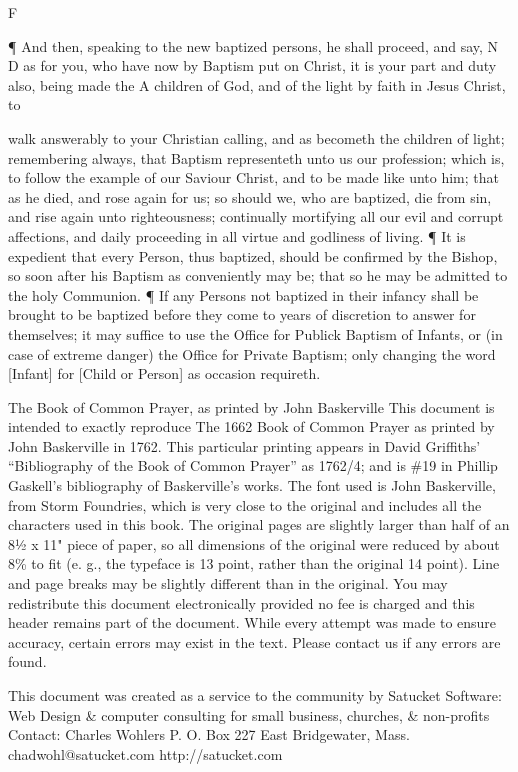 F

¶ And then, speaking to the new baptized persons, he shall proceed, and say, N D as for you, who have now by Baptism put on Christ, it is your part and duty also, being made the A children of God, and of the light by faith in Jesus Christ, to

walk answerably to your Christian calling, and as becometh the children of light; remembering always, that Baptism representeth unto us our profession; which is, to follow the example of our Saviour Christ, and to be made like unto him; that as he died, and rose again for us; so should we, who are baptized, die from sin, and rise again unto righteousness; continually mortifying all our evil and corrupt affections, and daily proceeding in all virtue and godliness of living. ¶ It is expedient that every Person, thus baptized, should be confirmed by the Bishop, so soon after his Baptism as conveniently may be; that so he may be admitted to the holy Communion. ¶ If any Persons not baptized in their infancy shall be brought to be baptized before they come to years of discretion to answer for themselves; it may suffice to use the Office for Publick Baptism of Infants, or (in case of extreme danger) the Office for Private Baptism; only changing the word [Infant] for [Child or Person] as occasion requireth.


The Book of Common Prayer, as printed by John Baskerville This document is intended to exactly reproduce The 1662 Book of Common Prayer as printed by John Baskerville in 1762. This particular printing appears in David Griffiths' “Bibliography of the Book of Common Prayer” as 1762/4; and is \#19 in Phillip Gaskell's bibliography of Baskerville's works. The font used is John Baskerville, from Storm Foundries, which is very close to the original and includes all the characters used in this book. The original pages are slightly larger than half of an 8½ x 11" piece of paper, so all dimensions of the original were reduced by about 8\% to fit (e. g., the typeface is 13 point, rather than the original 14 point). Line and page breaks may be slightly different than in the original. You may redistribute this document electronically provided no fee is charged and this header remains part of the document. While every attempt was made to ensure accuracy, certain errors may exist in the text. Please contact us if any errors are found.

This document was created as a service to the community by Satucket Software: Web Design \& computer consulting for small business, churches, \& non-profits Contact: Charles Wohlers P. O. Box 227 East Bridgewater, Mass. chadwohl@satucket.com http://satucket.com

